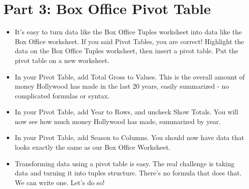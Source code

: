 \documentclass{article}
\begin{document}
\section*{Part 3: Box Office Pivot Table}
\begin{itemize}
    \item It's easy to turn data like the Box Office Tuples worksheet into data like the Box Office worksheet.  If you said Pivot Tables, you are correct!  Highlight the data on the Box Office Tuples worksheet, then insert a pivot table.  Put the pivot table on a new worksheet.
    \item In your Pivot Table, add Total Gross to Values.  This is the overall amount of money Hollywood has made in the last 20 years, easily summarized - no complicated formulas or syntax.
    \item In your Pivot Table, add Year to Rows, and uncheck Show Totals.  You will now see how much money Hollywood has made, summarized by year.
    \item In your Pivot Table, add Season to Columns.  You should now have data that looks exactly the same as our Box Office Worksheet.
    \item Transforming data using a pivot table is easy.  The real challenge is taking data and turning it into tuples structure.  There's no formula that does that.  We can write one.  Let's do so!
\end{itemize}
\end{document}

